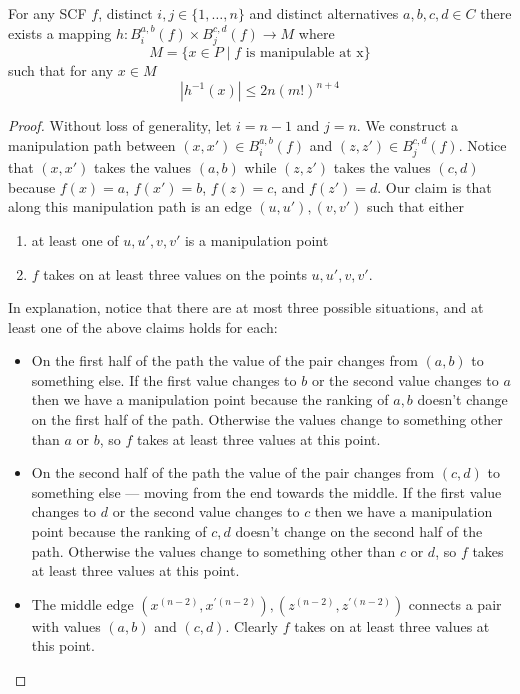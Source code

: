 	\begin{lemma}
		For any SCF $f$, distinct $i, j \in \{1, \ldots, n\}$ and distinct alternatives $a, b, c, d \in C$ there exists a mapping $h : B_i^{a,b}(f) \times B_j^{c,d}(f) \rightarrow M$ where
		\[
			M = \{x \in P \mid f \text{ is manipulable at x}\}
		\]
		such that for any $x \in M$
		\[
			|h^{-1}(x)| \le 2n(m!)^{n+4}
		\]
	\end{lemma}
	\begin{proof}
		Without loss of generality, let $i = n - 1$ and $j = n$. We construct a manipulation path between $(x, x') \in B_i^{a,b}(f)$ and $(z, z') \in B_j^{c,d}(f)$. Notice that $(x, x')$ takes the values $(a, b)$ while $(z, z')$ takes the values $(c, d)$ because $f(x) = a$, $f(x') = b$, $f(z) = c$, and $f(z') = d$. Our claim is that along this manipulation path is an edge $(u, u'), (v, v')$ such that either
		\begin{enumerate}
			\item at least one of $u, u', v, v'$ is a manipulation point
			\item $f$ takes on at least three values on the points $u, u', v, v'$.
		\end{enumerate}
		In explanation, notice that there are at most three possible situations, and at least one of the above claims holds for each:
		\begin{itemize}
			\item On the first half of the path the value of the pair changes from $(a, b)$ to something else. If the first value changes to $b$ or the second value changes to $a$ then we have a manipulation point because the ranking of $a, b$ doesn't change on the first half of the path. Otherwise the values change to something other than $a$ or $b$, so $f$ takes at least three values at this point.
			\item On the second half of the path the value of the pair changes from $(c, d)$ to something else --- moving from the end towards the middle. If the first value changes to $d$ or the second value changes to $c$ then we have a manipulation point because the ranking of $c, d$ doesn't change on the second half of the path. Otherwise the values change to something other than $c$ or $d$, so $f$ takes at least three values at this point.
			\item The middle edge $(x^{(n-2)}, x^{\prime(n-2)}), (z^{(n-2)}, z^{\prime(n-2)})$ connects a pair with values $(a, b)$ and $(c, d)$. Clearly $f$ takes on at least three values at this point.
		\end{itemize}


\end{proof}
